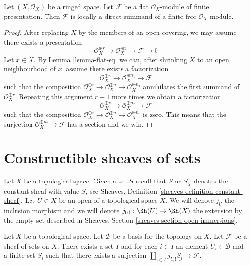 \begin{lemma}
\label{lemma-flat-locally-finite-presentation}
Let $(X, \mathcal{O}_X)$ be a ringed space. Let $\mathcal{F}$ be a
flat $\mathcal{O}_X$-module of finite presentation. Then $\mathcal{F}$ is
locally a direct summand of a finite free $\mathcal{O}_X$-module.
\end{lemma}

\begin{proof}
After replacing $X$ by the members of an open covering, we may
assume there exists a presentation
$$
\mathcal{O}_X^{\oplus r} \to
\mathcal{O}_X^{\oplus n} \to \mathcal{F} \to 0
$$
Let $x \in X$. By Lemma \ref{lemma-flat-eq}
we can, after shrinking $X$ to an open
neighbourhood of $x$, assume there exists a factorization
$$
\mathcal{O}_X^{\oplus n} \to
\mathcal{O}_X^{\oplus n_1} \to \mathcal{F}
$$
such that the composition
$\mathcal{O}_X^{\oplus r} \to \mathcal{O}_X^{\oplus n} \to
\mathcal{O}_X^{\oplus n_1}$
annihilates the first summand of $\mathcal{O}_X^{\oplus r}$.
Repeating this argument $r - 1$ more times we obtain a factorization
$$
\mathcal{O}_X^{\oplus n} \to
\mathcal{O}_X^{\oplus n_r} \to \mathcal{F}
$$
such that the composition
$\mathcal{O}_X^{\oplus r} \to \mathcal{O}_X^{\oplus n}
\to \mathcal{O}_X^{\oplus n_r}$ is zero.
This means that the surjection $\mathcal{O}_X^{\oplus n_r} \to \mathcal{F}$
has a section and we win.
\end{proof}







\section{Constructible sheaves of sets}
\label{section-constructible}

\noindent
Let $X$ be a topological space. Given a set $S$ recall that $\underline{S}$
or $\underline{S}_X$ denotes the constant sheaf with value $S$, see
Sheaves, Definition \ref{sheaves-definition-constant-sheaf}.
Let $U \subset X$ be an open of a topological space $X$.
We will denote $j_U$ the inclusion morphism and we will denote
$j_{U!} : \Sh(U) \to \Sh(X)$ the extension by the empty set
described in Sheaves, Section \ref{sheaves-section-open-immersions}.

\begin{lemma}
\label{lemma-surjection}
Let $X$ be a topological space. Let $\mathcal{B}$ be a basis for the
topology on $X$. Let $\mathcal{F}$ be a sheaf of sets on $X$.
There exists a set $I$ and for each $i \in I$ an element
$U_i \in \mathcal{B}$ and a finite set $S_i$ such that there exists
a surjection $\coprod_{i \in I} j_{U_i!}\underline{S_i} \to \mathcal{F}$.
\end{lemma}

